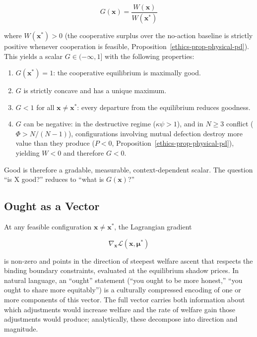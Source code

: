 \documentclass[11pt]{article}
\theoremstyle{plain}
\theoremstyle{definition}
\theoremstyle{remark}
\let\origsubsection\subsection
\renewcommand{\subsection}{\needspace{7\baselineskip}\origsubsection}
\providecommand{\tightlist}{%
  \setlength{\itemsep}{0pt}\setlength{\parskip}{0pt}}
\begin{document}
\[G(\mathbf{x}) = \frac{W(\mathbf{x})}{W(\mathbf{x}^*)}\]

where \(W(\mathbf{x}^*) > 0\) (the cooperative surplus over the
no-action baseline is strictly positive whenever cooperation is
feasible, Proposition~\ref{ethics-prop-physical-pd}). This yields a
scalar \(G \in (-\infty, 1]\) with the following properties:

\begin{enumerate}
\def\labelenumi{\arabic{enumi}.}
\tightlist
\item
  \(G(\mathbf{x}^*) = 1\): the cooperative equilibrium is maximally
  good.
\item
  \(G\) is strictly concave and has a unique maximum.
\item
  \(G < 1\) for all \(\mathbf{x} \neq \mathbf{x}^*\): every departure
  from the equilibrium reduces goodness.
\item
  \(G\) can be negative: in the destructive regime (\(\kappa\psi > 1\)),
  and in \(N \geq 3\) conflict (\(\Phi > N/(N-1)\)), configurations
  involving mutual defection destroy more value than they produce
  (\(P < 0\), Proposition~\ref{ethics-prop-physical-pd}), yielding
  \(W < 0\) and therefore \(G < 0\).
\end{enumerate}

Good is therefore a gradable, measurable, context-dependent scalar. The
question ``is X good?'' reduces to ``what is \(G(\mathbf{x})\)?''

\subsection{Ought as a Vector}\label{ought-as-a-vector}

At any feasible configuration \(\mathbf{x} \neq \mathbf{x}^*\), the
Lagrangian gradient

\[\nabla_{\mathbf{x}} \mathcal{L}(\mathbf{x}, \boldsymbol{\mu}^*)\]

is non-zero and points in the direction of steepest welfare ascent that
respects the binding boundary constraints, evaluated at the equilibrium
shadow prices. In natural language, an ``ought'' statement (``you ought
to be more honest,'' ``you ought to share more equitably'') is a
culturally compressed encoding of one or more components of this vector.
The full vector carries both information about which adjustments would
increase welfare and the rate of welfare gain those adjustments would
produce; analytically, these decompose into direction and magnitude.
\end{document}
